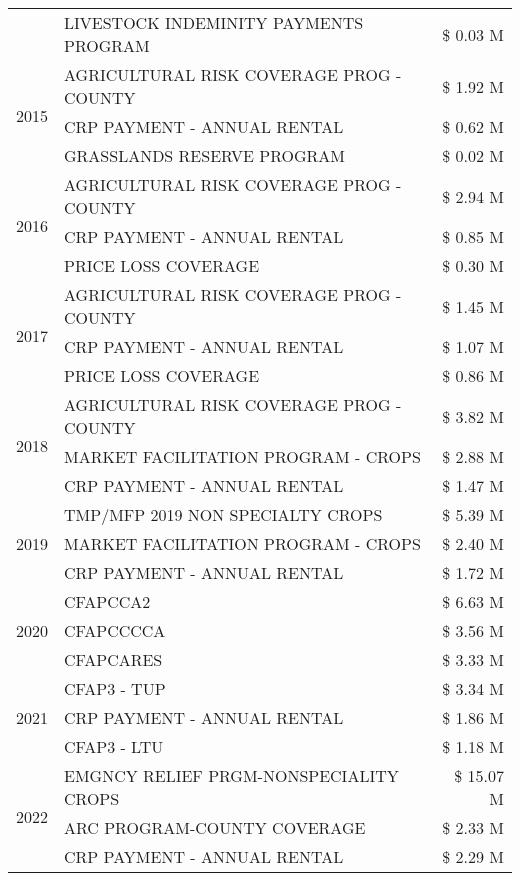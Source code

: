 \begin{tabular}{llr}
 & LIVESTOCK INDEMINITY PAYMENTS PROGRAM & \$ 0.03 M \\
\cline{1-3}
\multirow[t]{3}{*}{2015} & AGRICULTURAL RISK COVERAGE PROG - COUNTY & \$ 1.92 M \\
 & CRP PAYMENT - ANNUAL RENTAL & \$ 0.62 M \\
 & GRASSLANDS RESERVE PROGRAM & \$ 0.02 M \\
\cline{1-3}
\multirow[t]{3}{*}{2016} & AGRICULTURAL RISK COVERAGE PROG - COUNTY & \$ 2.94 M \\
 & CRP PAYMENT - ANNUAL RENTAL & \$ 0.85 M \\
 & PRICE LOSS COVERAGE & \$ 0.30 M \\
\cline{1-3}
\multirow[t]{3}{*}{2017} & AGRICULTURAL RISK COVERAGE PROG - COUNTY & \$ 1.45 M \\
 & CRP PAYMENT - ANNUAL RENTAL & \$ 1.07 M \\
 & PRICE LOSS COVERAGE & \$ 0.86 M \\
\cline{1-3}
\multirow[t]{3}{*}{2018} & AGRICULTURAL RISK COVERAGE PROG - COUNTY & \$ 3.82 M \\
 & MARKET FACILITATION PROGRAM - CROPS & \$ 2.88 M \\
 & CRP PAYMENT - ANNUAL RENTAL & \$ 1.47 M \\
\cline{1-3}
\multirow[t]{3}{*}{2019} & TMP/MFP 2019 NON SPECIALTY CROPS & \$ 5.39 M \\
 & MARKET FACILITATION PROGRAM - CROPS & \$ 2.40 M \\
 & CRP PAYMENT - ANNUAL RENTAL & \$ 1.72 M \\
\cline{1-3}
\multirow[t]{3}{*}{2020} & CFAPCCA2 & \$ 6.63 M \\
 & CFAPCCCCA & \$ 3.56 M \\
 & CFAPCARES & \$ 3.33 M \\
\cline{1-3}
\multirow[t]{3}{*}{2021} & CFAP3 - TUP & \$ 3.34 M \\
 & CRP PAYMENT - ANNUAL RENTAL & \$ 1.86 M \\
 & CFAP3 - LTU & \$ 1.18 M \\
\cline{1-3}
\multirow[t]{3}{*}{2022} & EMGNCY RELIEF PRGM-NONSPECIALITY CROPS & \$ 15.07 M \\
 & ARC PROGRAM-COUNTY COVERAGE & \$ 2.33 M \\
 & CRP PAYMENT - ANNUAL RENTAL & \$ 2.29 M \\
\cline{1-3}
\bottomrule
\end{tabular}
